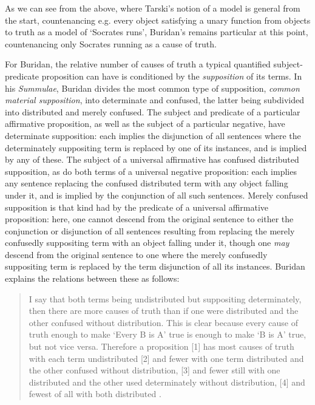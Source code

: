 \documentclass[]{article}
\begin{document}
As we can see from the above, where Tarski's notion of a model is general from the start, countenancing e.g. every object satisfying a unary function from objects to truth as a model of `Socrates runs', Buridan's remains particular at this point, countenancing only Socrates running as a cause of truth.

For Buridan, the relative number of causes of truth a typical quantified subject-predicate proposition can have is conditioned by the \textit{supposition} of its terms. In his \textit{Summulae}, Buridan divides the most common type of supposition, \textit{common material supposition}, into determinate and confused, the latter being subdivided into distributed and merely confused. The subject and predicate of a particular affirmative proposition, as well as the subject of a particular negative, have determinate supposition: each implies the disjunction of all sentences where the determinately suppositing term is replaced by one of its instances, and is implied by any of these. The subject of a universal affirmative has confused distributed supposition, as do both terms of a universal negative proposition: each implies any sentence replacing the confused distributed term with any object falling under it, and is implied by the conjunction of all such sentences. Merely confused supposition is that kind had by the predicate of a universal affirmative proposition: here, one cannot descend from the original sentence to either the conjunction or disjunction of all sentences resulting from replacing the merely confusedly suppositing term with an object falling under it, though one \textit{may} descend from the original sentence to one where the merely confusedly suppositing term is replaced by the term disjunction of all its instances. Buridan explains the relations between these as follows:

\begin{quote}
	I say that both terms being undistributed but suppositing determinately, then there are more causes of truth than if one were distributed and the other confused without distribution. This is clear because every cause of truth enough to make `Every B is A' true is enough to make `B is A' true, but not vice versa. Therefore a proposition [1] has most causes of truth with each term undistributed [2] and fewer with one term distributed and the other confused without distribution, [3] and fewer still with one distributed and the other used determinately without distribution, [4] and fewest of all with both distributed \autocite[I. 2, 66]{Buridan2015}.
\end{quote}
\end{document}
